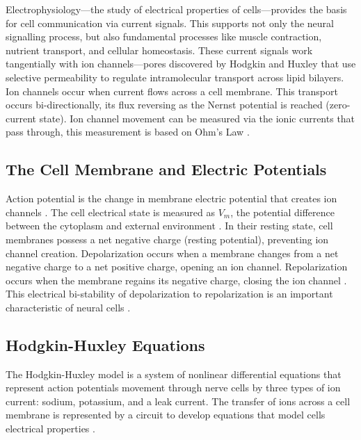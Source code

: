 \documentclass{article} %
\begin{document}
\begin{multicols}{2}
Electrophysiology—the study of electrical properties of cells—provides the basis for cell communication via current signals. 
This supports not only the neural signalling process, but also fundamental processes like muscle contraction, nutrient transport, and cellular homeostasis. 
These current signals work tangentially with ion channels—pores discovered by Hodgkin and Huxley that use selective permeability to regulate intramolecular transport across lipid bilayers. 
Ion channels occur when current flows across a cell membrane. This transport occurs bi-directionally, its flux reversing as the Nernst potential is reached (zero-current state). 
Ion channel movement can be measured via the ionic currents that pass through, this measurement is based on Ohm's Law \citep{rubaiy2017electrophysiology}.

\subsection{The Cell Membrane and Electric Potentials}
\label{subsubsec:resting_potential}

Action potential is the change in membrane electric potential that creates ion channels \cite{rubaiy2017electrophysiology}. 
The cell electrical state is measured as $V_{m}$, the potential difference between the cytoplasm and external environment \cite{cervera2016bioelectrical}. 
In their resting state, cell membranes possess a net negative charge (resting potential), preventing ion channel creation. 
Depolarization occurs when a membrane changes from a net negative charge to a net positive charge, opening an ion channel. 
Repolarization occurs when the membrane regains its negative charge, closing the ion channel \cite{rubaiy2017electrophysiology}. 
This electrical bi-stability of depolarization to repolarization is an important characteristic of neural cells \cite{cervera2016bioelectrical}.

\subsection{Hodgkin-Huxley Equations}
\label{subsec:hodgekin_huxley}

The Hodgkin-Huxley model is a system of nonlinear differential equations that represent action potentials movement through nerve cells by three types of ion current: sodium, potassium, and a leak current. 
The transfer of ions across a cell membrane is represented by a circuit to develop equations that model cells electrical properties \cite{Schwiening2012}. 


\end{multicols}
\end{document}
